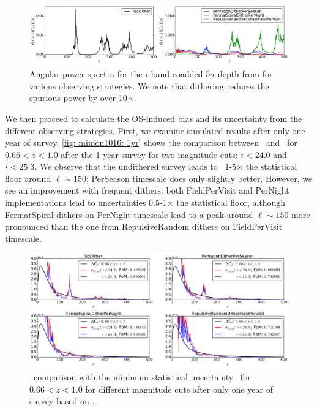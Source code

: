 \begin{figure}[!htb]
      \centering\includegraphics[width=\linewidth]{figs/awan_coaddpowerspectrum.pdf}
      \vspace*{-2em}
\caption{Angular power spectra for the  $i$-band coadded 5$\sigma$ depth from  for various observing strategies. We note that dithering reduces the spurious power by over 10$\times$.}
\label{fig: coaddPowerSpectrum}
\end{figure}

We then proceed to calculate the OS-induced bias and its uncertainty from the different observing strategies. First, we examine simulated results after only one year of survey. \autoref{fig: minion1016: 1yr} shows the comparison between \sigmaOS\ and \statFloor\ for $0.66<z<1.0$ after the 1-year survey for two magnitude cuts: $i<24.0$ and $i<25.3$. We observe that the undithered survey leads to \sigmaOS\ 1-5$\times$ the statistical floor around $\ell\sim150$; PerSeason timescale does only slightly better. However, we see an improvement with frequent dithers: both FieldPerVisit and PerNight implementations lead to uncertainties 0.5-1$\times$ the statistical floor, although FermatSpiral dithers on PerNight timescale lead to a peak around $\ell\sim150$ more pronounced than the one from RepulsiveRandom dithers on FieldPerVisit timescale.

\begin{figure}[!htb]
      \centering\hspace*{1em}\includegraphics[width=\linewidth]{figs/awan_1yr_minion1016_2magCuts.pdf}
       \vspace*{-2em}
\caption{\sigmaOS\ comparison with the minimum statistical uncertainty \statFloor\ for $0.66<z<1.0$ for different magnitude cuts after only one year of survey based on .}
\label{fig: minion1016: 1yr}
\end{figure}

